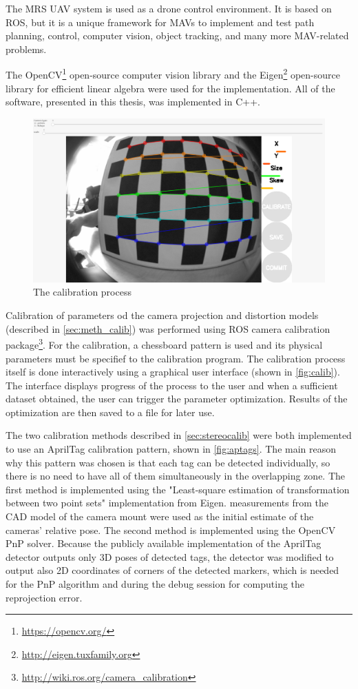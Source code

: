 The MRS UAV system \cite{Baca2021} is used as a drone control environment. It is based on ROS, but it is a unique framework for MAVs to implement and test path planning, control, computer vision, object tracking, and many more MAV-related problems.

The OpenCV\footnote{\url{https://opencv.org/}} open-source computer vision library and the Eigen\footnote{\url{http://eigen.tuxfamily.org}} open-source library for efficient linear algebra were used for the implementation.
All of the software, presented in this thesis, was implemented in C++.

\begin{figure}[h]
    \centering
    \includegraphics[width=.6\textwidth]{graphics/calibration.png}
    \caption{The calibration process}
    \label{fig:calib}
\end{figure}

Calibration of parameters od the camera projection and distortion models (described in \autoref{sec:meth_calib}) was performed using ROS camera calibration package\footnote{\url{http://wiki.ros.org/camera_calibration}}.
For the calibration, a chessboard pattern is used and its physical parameters must be specifief to the calibration program.
The calibration process itself is done interactively using a graphical user interface (shown in \autoref{fig:calib}).
The interface displays progress of the process to the user and when a sufficient dataset obtained, the user can trigger the parameter optimization. 
Results of the optimization are then saved to a file for later use.

The two calibration methods described in \autoref{sec:stereocalib} were both implemented to use an AprilTag calibration pattern, shown in \autoref{fig:aptags}.
The main reason why this pattern was chosen is that each tag can be detected individually, so there is no need to have all of them simultaneously in the overlapping zone.
The first method is implemented using the "Least-square estimation of transformation between two point sets" \cite{Umeyama1991} implementation from Eigen.
measurements from the CAD model of the camera mount were used as the initial estimate of the cameras' relative pose.
The second method is implemented using the OpenCV PnP solver.
Because the publicly available implementation of the AprilTag detector outputs only 3D poses of detected tags, the detector was modified to output also 2D coordinates of corners of the detected markers, which is needed for the PnP algorithm and during the debug session for computing the reprojection error.

